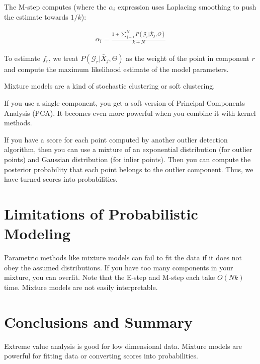 \documentclass[a4paper]{article}
\begin{document}
The M-step computes (where the $\alpha_i$ expression uses Laplacing smoothing
to push the estimate towards $1/k$):

\begin{align}
  \alpha_i = \frac{1 + \sum_{j=1}^{N}{P(\mathcal{G}_r | \bar{X}_j, \Theta)}}{
  k + N}
\end{align}

To estimate $f_r$, we treat $P(\mathcal{G}_r | \bar{X}_j, \Theta)$ as the
weight of the point in component $r$ and compute the maximum likelihood estimate
of the model parameters.

Mixture models are a kind of stochastic clustering or soft clustering.

If you use a single component, you get a soft version of Principal Components
Analysis (PCA). It becomes even more powerful when you combine it with
kernel methods.

If you have a score for each point computed by another outlier detection
algorithm, then you can use a mixture of an exponential distribution (for
outlier points) and Gaussian distribution (for inlier points). Then you
can compute the posterior probability that each point belongs to the outlier
component. Thus, we have turned scores into probabilities.

\section{Limitations of Probabilistic Modeling}
Parametric methods like mixture models can fail to fit the data if it does
not obey the assumed distributions. If you have too many components in your
mixture, you can overfit. Note that the E-step and M-step each take $O(Nk)$
time. Mixture models are not easily interpretable.


\section{Conclusions and Summary}
Extreme value analysis is good for low dimensional data. Mixture models are
powerful for fitting data or converting scores into probabilities.
\end{document}

